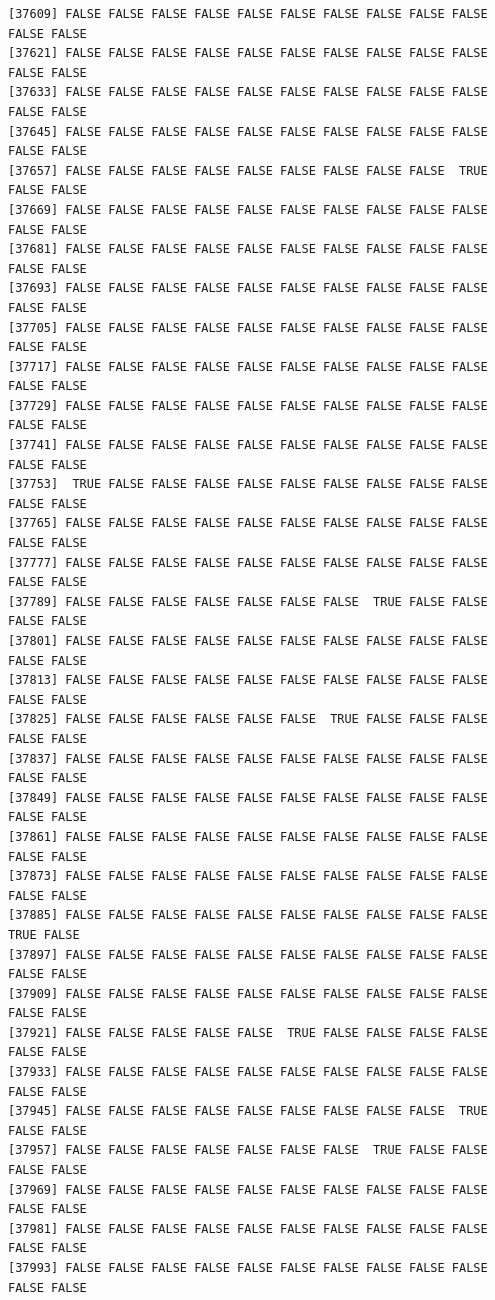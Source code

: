 \documentclass[
  a4paper,
  DIV=11,
  numbers=noendperiod]{scrartcl}
\begin{document}
\begin{verbatim}
[37609] FALSE FALSE FALSE FALSE FALSE FALSE FALSE FALSE FALSE FALSE FALSE FALSE
[37621] FALSE FALSE FALSE FALSE FALSE FALSE FALSE FALSE FALSE FALSE FALSE FALSE
[37633] FALSE FALSE FALSE FALSE FALSE FALSE FALSE FALSE FALSE FALSE FALSE FALSE
[37645] FALSE FALSE FALSE FALSE FALSE FALSE FALSE FALSE FALSE FALSE FALSE FALSE
[37657] FALSE FALSE FALSE FALSE FALSE FALSE FALSE FALSE FALSE  TRUE FALSE FALSE
[37669] FALSE FALSE FALSE FALSE FALSE FALSE FALSE FALSE FALSE FALSE FALSE FALSE
[37681] FALSE FALSE FALSE FALSE FALSE FALSE FALSE FALSE FALSE FALSE FALSE FALSE
[37693] FALSE FALSE FALSE FALSE FALSE FALSE FALSE FALSE FALSE FALSE FALSE FALSE
[37705] FALSE FALSE FALSE FALSE FALSE FALSE FALSE FALSE FALSE FALSE FALSE FALSE
[37717] FALSE FALSE FALSE FALSE FALSE FALSE FALSE FALSE FALSE FALSE FALSE FALSE
[37729] FALSE FALSE FALSE FALSE FALSE FALSE FALSE FALSE FALSE FALSE FALSE FALSE
[37741] FALSE FALSE FALSE FALSE FALSE FALSE FALSE FALSE FALSE FALSE FALSE FALSE
[37753]  TRUE FALSE FALSE FALSE FALSE FALSE FALSE FALSE FALSE FALSE FALSE FALSE
[37765] FALSE FALSE FALSE FALSE FALSE FALSE FALSE FALSE FALSE FALSE FALSE FALSE
[37777] FALSE FALSE FALSE FALSE FALSE FALSE FALSE FALSE FALSE FALSE FALSE FALSE
[37789] FALSE FALSE FALSE FALSE FALSE FALSE FALSE  TRUE FALSE FALSE FALSE FALSE
[37801] FALSE FALSE FALSE FALSE FALSE FALSE FALSE FALSE FALSE FALSE FALSE FALSE
[37813] FALSE FALSE FALSE FALSE FALSE FALSE FALSE FALSE FALSE FALSE FALSE FALSE
[37825] FALSE FALSE FALSE FALSE FALSE FALSE  TRUE FALSE FALSE FALSE FALSE FALSE
[37837] FALSE FALSE FALSE FALSE FALSE FALSE FALSE FALSE FALSE FALSE FALSE FALSE
[37849] FALSE FALSE FALSE FALSE FALSE FALSE FALSE FALSE FALSE FALSE FALSE FALSE
[37861] FALSE FALSE FALSE FALSE FALSE FALSE FALSE FALSE FALSE FALSE FALSE FALSE
[37873] FALSE FALSE FALSE FALSE FALSE FALSE FALSE FALSE FALSE FALSE FALSE FALSE
[37885] FALSE FALSE FALSE FALSE FALSE FALSE FALSE FALSE FALSE FALSE  TRUE FALSE
[37897] FALSE FALSE FALSE FALSE FALSE FALSE FALSE FALSE FALSE FALSE FALSE FALSE
[37909] FALSE FALSE FALSE FALSE FALSE FALSE FALSE FALSE FALSE FALSE FALSE FALSE
[37921] FALSE FALSE FALSE FALSE FALSE  TRUE FALSE FALSE FALSE FALSE FALSE FALSE
[37933] FALSE FALSE FALSE FALSE FALSE FALSE FALSE FALSE FALSE FALSE FALSE FALSE
[37945] FALSE FALSE FALSE FALSE FALSE FALSE FALSE FALSE FALSE  TRUE FALSE FALSE
[37957] FALSE FALSE FALSE FALSE FALSE FALSE FALSE  TRUE FALSE FALSE FALSE FALSE
[37969] FALSE FALSE FALSE FALSE FALSE FALSE FALSE FALSE FALSE FALSE FALSE FALSE
[37981] FALSE FALSE FALSE FALSE FALSE FALSE FALSE FALSE FALSE FALSE FALSE FALSE
[37993] FALSE FALSE FALSE FALSE FALSE FALSE FALSE FALSE FALSE FALSE FALSE FALSE

\end{verbatim}
\end{document}
